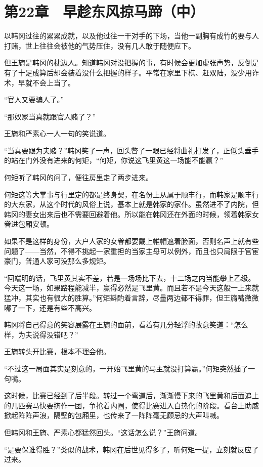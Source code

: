 \section{第22章　早趁东风掠马蹄（中）}

以韩冈过往的累累成就，以及他过往一干对手的下场，当他一副胸有成竹的要与人打赌，世上往往会被他的气势压住，没有几人敢于随便应下。

但王旖是韩冈的枕边人。知道韩冈对没把握的事，有时候会更加虚张声势，反倒是有了十足成算后却会装着没什么把握的样子。平常在家里下棋、赶双陆，没少用诈术，早就不会上当了。

“官人又要骗人了。”

“那奴家当真就跟官人赌了？”

王旖和严素心一人一句的笑说道。

“当真要跟为夫赌？”韩冈笑了一声，回头瞥了一眼已经将曲礼打发了，正低头垂手的站在门外没有进来的何矩，“何矩，你说这飞里黄这一场能不能赢？”

何矩听了韩冈的问了，便往房里走了两步进来。

何矩这等大掌事与行里定的都是终身契，在名份上从属于顺丰行，而韩家是顺丰行的大东家，从这个时代的风俗上说，基本上就是韩家的家仆。虽然进不了内院，但韩冈的妻女出来后也不需要回避着他。所以能在韩冈还在外面的时候，领着韩家女眷进包厢安顿。

如果不是这样的身份，大户人家的女眷都要戴上帷帽遮着脸面，否则名声上就有些问题了——当然，不得不挑起一家重担的当家主母可以例外，而且也只局限于官宦豪门，普通人家可没那么多规矩。

“回端明的话，飞里黄其实不差，若是一场场比下去，十二场之内当能攀上乙级。今天这一场，如果路程能减半，赢得必然是飞里黄。而且若不是今天这般一上来就猛冲，其实也有很大的胜算。”何矩斟酌着言辞，尽量两边都不得罪，但王旖嘴微微嘟了一下，还是有些不高兴。

韩冈将自己得意的笑容展露在王旖的面前，看着有几分轻浮的故意笑道：“怎么样，为夫说得没错吧？”

王旖转头开比赛，根本不理会他。

“不过这一局面其实是刻意的，一开始飞里黄的马主就没打算赢。”何矩突然插了一句嘴。

这时候，比赛已经到了后半段。转过一个弯道后，渐渐慢下来的飞里黄和后面追上的几匹赛马快要挤作一团，争抢着内圈，使得比赛进入白热化的阶段。看台上助威掀起阵阵声浪，隔壁的包厢里，也传来了一阵阵毫无顾忌的大声叫喊。

但韩冈和王旖、严素心都猛然回头。“这话怎么说？”王旖问道。

“是要保谁得胜？”类似的战术，韩冈在后世见得多了，听何矩一提，立刻就反应了过来。

